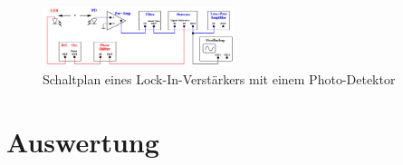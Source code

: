 \documentclass[
  bibliography=totoc,     %
  captions=tableheading,  %
  titlepage=firstiscover, %
]{scrartcl}
\begin{document}
\begin{figure}[htb]
  \centering
  \includegraphics[width=0.5\textwidth]{V3032.png}
  \caption{Schaltplan eines Lock-In-Verstärkers mit einem Photo-Detektor}
  \label{fig:V3032}
\end{figure}

\newpage
\section{Auswertung}
\label{sec:auswertung}
\end{document}
